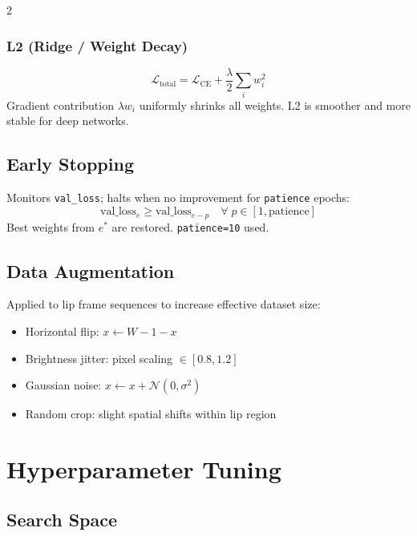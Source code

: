 \documentclass[10pt, a4paper]{article}
\begin{document}
\begin{multicols}{2}
\subsubsection{L2 (Ridge / Weight Decay)}
\begin{equation}
\mathcal{L}_{\text{total}} = \mathcal{L}_{\text{CE}} + \frac{\lambda}{2} \sum_i w_i^2
\end{equation}
Gradient contribution $\lambda w_i$ uniformly shrinks all weights.
L2 is smoother and more stable for deep networks.

\subsection{Early Stopping}
Monitors \texttt{val\_loss}; halts when no improvement for \texttt{patience} epochs:
\begin{equation}
\text{val\_loss}_{e} \geq \text{val\_loss}_{e - p}
\quad \forall\; p \in [1, \text{patience}]
\end{equation}
Best weights from $e^*$ are restored. \texttt{patience=10} used.

\subsection{Data Augmentation}
Applied to lip frame sequences to increase effective dataset size:
\begin{itemize}
  \item Horizontal flip: $x \leftarrow W - 1 - x$
  \item Brightness jitter: pixel scaling $\in [0.8, 1.2]$
  \item Gaussian noise: $x \leftarrow x + \mathcal{N}(0,\sigma^2)$
  \item Random crop: slight spatial shifts within lip region
\end{itemize}

\section{Hyperparameter Tuning}

\subsection{Search Space}


\end{multicols}
\end{document}

